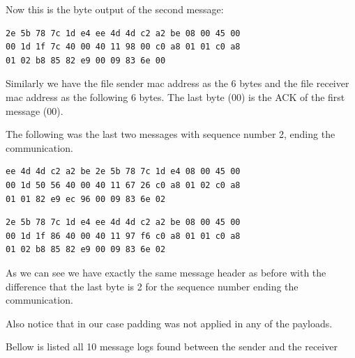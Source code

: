 \documentclass[paper=a4, fontsize=11pt]{scrartcl}
\numberwithin{equation}{section}		%
\numberwithin{figure}{section}			%
\numberwithin{table}{section}				%
\begin{document}
Now this is the byte output of the second message:
\begin{lstlisting}
2e 5b 78 7c 1d e4 ee 4d 4d c2 a2 be 08 00 45 00
00 1d 1f 7c 40 00 40 11 98 00 c0 a8 01 01 c0 a8
01 02 b8 85 82 e9 00 09 83 6e 00
\end{lstlisting}

Similarly we have the file sender mac address as the 6 bytes and the file receiver mac address as the following 6 bytes.
The last byte (00) is the ACK of the first message (00).


The following was the last two messages with sequence number 2,
ending the communication.

\begin{lstlisting}
ee 4d 4d c2 a2 be 2e 5b 78 7c 1d e4 08 00 45 00
00 1d 50 56 40 00 40 11 67 26 c0 a8 01 02 c0 a8
01 01 82 e9 ec 96 00 09 83 6e 02
\end{lstlisting}

\begin{lstlisting}
2e 5b 78 7c 1d e4 ee 4d 4d c2 a2 be 08 00 45 00
00 1d 1f 86 40 00 40 11 97 f6 c0 a8 01 01 c0 a8
01 02 b8 85 82 e9 00 09 83 6e 02              
\end{lstlisting}

As we can see we have exactly the same message header as before
with the difference that the last byte is 2 for the sequence number ending the communication.

Also notice that in our case padding was not applied in any of the payloads.

Bellow is listed all 10 message logs found between the sender
and the receiver
\end{document}
